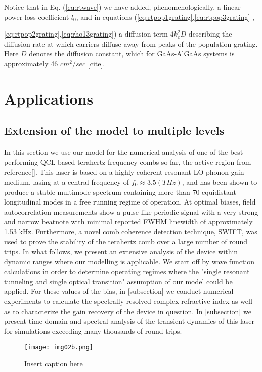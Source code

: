 \documentclass[10pt,letterpaper]{article}
\begin{document}
Notice that in Eq. (\ref{eq:rtwave}) we have added, phenomenologically, a linear power loss coefficient $l_0$, and in equations (\ref{eq:rtpop1grating},\ref{eq:rtpop3grating} ,{\ref{eq:rtpop2grating},\ref{eq:rho13grating}) a diffusion term $4k_c^2D$ describing the diffusion rate at which carriers diffuse away from peaks of the population grating. Here $D$ denotes the diffusion constant, which for GaAs-AlGaAs systems is approximately 46 $cm^2/sec$ [cite].
\section{Applications}
\subsection{Extension of the model to multiple levels}
In this section we use our model for the numerical analysis of one of the best performing QCL based terahertz frequency combs so far, the active region from reference[]. This laser is based on a highly coherent resonant LO phonon gain medium, lasing at a central frequency of $f_0\approx 3.5 (THz)$, and  has been shown to produce a stable multimode spectrum containing more than 70 equidistant longitudinal modes in a free running regime of operation. At optimal biases, field autocorrelation measurements show a pulse-like periodic signal with a very strong and narrow beatnote with minimal reported FWHM linewidth of approximately 1.53 kHz. Furthermore, a novel comb coherence detection technique, SWIFT, was used to prove the stability of the terahertz comb over a large number of round trips. In what follows, we present an extensive analysis of the device within dynamic ranges where our modelling is applicable. We start off by wave function calculations in order to determine operating regimes where the "single resonant tunneling and single optical transition" assumption of our model could be applied. For these values of the bias, in [subsection] we conduct numerical experiments to calculate the spectrally resolved complex refractive index as well as to characterize the gain recovery of the device in question. In [subsection] we present time domain and spectral analysis of the transient dynamics of this laser for simulations exceeding many thousands of round trips.  

\begin{figure}[h!]
	\begin{center}
		\texttt{[image: img02b.png]}
		\caption{Insert caption here} \label{fig:img02}
	\end{center}	
\end{figure}

}
\end{document}
